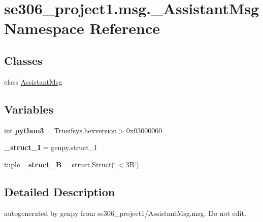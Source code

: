 \hypertarget{namespacese306__project1_1_1msg_1_1__AssistantMsg}{\section{se306\-\_\-project1.\-msg.\-\_\-\-Assistant\-Msg Namespace Reference}
\label{namespacese306__project1_1_1msg_1_1__AssistantMsg}
}
\subsection*{Classes}
\begin{DoxyCompactItemize}
\item 
class \hyperlink{classse306__project1_1_1msg_1_1__AssistantMsg_1_1AssistantMsg}{Assistant\-Msg}
\end{DoxyCompactItemize}
\subsection*{Variables}
\begin{DoxyCompactItemize}
\item 
\hypertarget{namespacese306__project1_1_1msg_1_1__AssistantMsg_af876ad1bcd23a114cb3d84df098ca1d3}{int {\bfseries python3} = Trueifsys.\-hexversion$>$0x03000000}\label{namespacese306__project1_1_1msg_1_1__AssistantMsg_af876ad1bcd23a114cb3d84df098ca1d3}

\item 
\hypertarget{namespacese306__project1_1_1msg_1_1__AssistantMsg_ab3f40acfd3fd1563a2871472bb647419}{{\bfseries \-\_\-struct\-\_\-\-I} = genpy.\-struct\-\_\-\-I}\label{namespacese306__project1_1_1msg_1_1__AssistantMsg_ab3f40acfd3fd1563a2871472bb647419}

\item 
\hypertarget{namespacese306__project1_1_1msg_1_1__AssistantMsg_af613e9c58400c485413fccda417ff166}{tuple {\bfseries \-\_\-struct\-\_\-B} = struct.\-Struct(\char`\"{}$<$3\-B\char`\"{})}\label{namespacese306__project1_1_1msg_1_1__AssistantMsg_af613e9c58400c485413fccda417ff166}

\end{DoxyCompactItemize}


\subsection{Detailed Description}
\begin{DoxyVerb}autogenerated by genpy from se306_project1/AssistantMsg.msg. Do not edit.\end{DoxyVerb}
 
